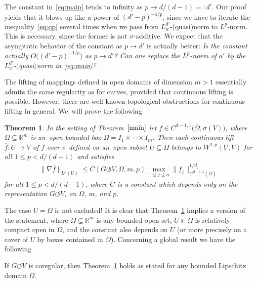 \documentclass[pdftex]{sigma}
\numberwithin{equation}{section}
\newtheorem{Theorem}{Theorem}[section]
\def\si{\sigma}
\def\Om{\Omega}
\def\R{\mathbb{R}}
\def\ol{\overline}
\def\acts{\circlearrowleft}
\begin{document}
\begin{Question}
	The constant in~\eqref{eq:main} tends to infinity as $p \to d/(d-1)=:d'$.
	Our proof yields that it blows up like a power of $(d'-p)^{-1/p}$, since we have to iterate the
	inequality~\eqref{eq:qp} several times when we pass from $L^{d'}_w$-(quasi)norm to $L^p$-norm.
	This is necessary, since the former is not $\si$-additive.
	We expect that the asymptotic behavior of the constant as $p \to d'$ is actually better:
	{\it Is the constant actually $O\big((d'-p)^{-1/p}\big)$ as $p \to d'$?
	Can one replace the $L^p$-norm of $\ol a'$ by the $L^{d'}_w$-$($quasi$)$norm in~\eqref{eq:main}?} 	
\end{Question}

The lifting of mappings defined in open domains of dimension $m > 1$ essentially
admits the same regularity as for curves, provided that continuous lifting is possible.
However, there are well-known topological obstructions for continuous lifting in general. We~will prove the following

\begin{Theorem} \label{main2}
	In the setting of Theorem~$\ref{main}$
	let $f \in C^{d-1,1}\big(\ol \Om,\si(V)\big)$,
	where $\Om \subseteq \R^m$ is an~open bounded box $\Om = I_1 \times \cdots \times I_m$.
	Then each continuous lift $\ol f \colon U \to V$ of $f$ over $\si$
	defined on an~open subset $U \subseteq \Om$
	belongs to $W^{1,p}(U,V)$ for all $1 \le p < d/(d-1)$
 and satisfies
 \begin{gather} \label{eq:main2}
 \big\|\nabla \ol f\big\|_{L^p(U)} \le
 C(G \acts V,\Om,m,p)\, \max_{1 \le j \le n} \|f_j\|^{1/d_j}_{C^{d-1,1}(\ol \Om)}
 \end{gather}
 for all $1 \le p < d/(d-1)$,
 where $C$ is a constant which depends only on the representation $G \acts V$, on $\Om$, $m$, and $p$.
\end{Theorem}

The case $U = \Om$ is not excluded!
It is clear that Theorem~\ref{main2} implies a version of the statement, where
$\Om \subseteq \R^m$ is any bounded open set,
$U \Subset \Om$ is relatively compact open in $\Om$,
and the constant also depends on $U$ (or more precisely on a cover of $U$ by boxes contained in $\Om$).
Concerning a global result we have the following


\begin{Remark} \label{rem:main2}
	If $G \acts V$ is coregular, then Theorem~\ref{main2} holds as stated for any bounded Lipschitz domain $\Om$.
\end{Remark}
\end{document}
